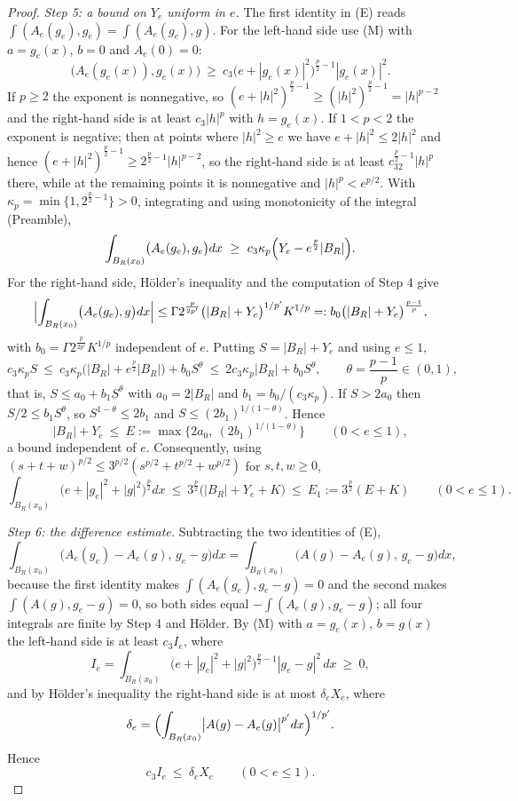 \begin{proof}
\emph{Step 5: a bound on $Y_e$ uniform in $e$.}  The first identity in (E) reads
$\int(A_e(g_e),g_e)=\int(A_e(g_e),g)$.  For the left-hand side use (M) with
$a=g_e(x)$, $b=0$ and $A_e(0)=0$:
\[
\bigl(A_e(g_e(x)),g_e(x)\bigr)\ \ge\ c_3\bigl(e+|g_e(x)|^2\bigr)^{\frac p2-1}|g_e(x)|^2 .
\]
If $p\ge2$ the exponent is nonnegative, so
$(e+|h|^2)^{\frac p2-1}\ge(|h|^2)^{\frac p2-1}=|h|^{p-2}$ and the right-hand
side is at least $c_3|h|^p$ with $h=g_e(x)$.  If $1<p<2$ the exponent is
negative; then at points where $|h|^2\ge e$ we have $e+|h|^2\le2|h|^2$ and hence
$(e+|h|^2)^{\frac p2-1}\ge2^{\frac p2-1}|h|^{p-2}$, so the right-hand side is at
least $c_32^{\frac p2-1}|h|^p$ there, while at the remaining points it is
nonnegative and $|h|^p<e^{p/2}$.  With $\kappa_p=\min\{1,2^{\frac p2-1}\}>0$,
integrating and using monotonicity of the integral (Preamble),
\[
\int_{B_R(x_0)}\bigl(A_e(g_e),g_e\bigr)dx
\ \ge\ c_3\kappa_p\Bigl(Y_e-e^{\frac p2}|B_R|\Bigr).
\]
For the right-hand side, Hölder's inequality and the computation of Step 4 give
\[
\Bigl|\int_{B_R(x_0)}\bigl(A_e(g_e),g\bigr)dx\Bigr|
\le\Gamma2^{\frac p{2p'}}\bigl(|B_R|+Y_e\bigr)^{1/p'}K^{1/p}
=:b_0\bigl(|B_R|+Y_e\bigr)^{\frac{p-1}p},
\]
with $b_0=\Gamma2^{\frac p{2p'}}K^{1/p}$ independent of $e$.  Putting
$S=|B_R|+Y_e$ and using $e\le1$,
\[
c_3\kappa_pS\ \le\ c_3\kappa_p\bigl(|B_R|+e^{\frac p2}|B_R|\bigr)+b_0S^{\theta}
\ \le\ 2c_3\kappa_p|B_R|+b_0S^{\theta},
\qquad \theta=\frac{p-1}p\in(0,1),
\]
that is, $S\le a_0+b_1S^{\theta}$ with $a_0=2|B_R|$ and
$b_1=b_0/(c_3\kappa_p)$.  If $S>2a_0$ then $S/2\le b_1S^{\theta}$, so
$S^{1-\theta}\le2b_1$ and $S\le(2b_1)^{1/(1-\theta)}$.  Hence
\[
|B_R|+Y_e\ \le\ E:=\max\bigl\{2a_0,\ (2b_1)^{1/(1-\theta)}\bigr\}
\qquad(0<e\le1),
\tag{5a}
\]
a bound independent of $e$.  Consequently, using
$(s+t+w)^{p/2}\le3^{p/2}(s^{p/2}+t^{p/2}+w^{p/2})$ for $s,t,w\ge0$,
\[
\int_{B_R(x_0)}\bigl(e+|g_e|^2+|g|^2\bigr)^{\frac p2}dx
\ \le\ 3^{\frac p2}\bigl(|B_R|+Y_e+K\bigr)\ \le\ E_1:=3^{\frac p2}(E+K)
\qquad(0<e\le1).
\tag{5b}
\]

\emph{Step 6: the difference estimate.}  Subtracting the two identities of (E),
\[
\int_{B_R(x_0)}\bigl(A_e(g_e)-A_e(g),\,g_e-g\bigr)dx
=\int_{B_R(x_0)}\bigl(A(g)-A_e(g),\,g_e-g\bigr)dx ,
\]
because the first identity makes $\int(A_e(g_e),g_e-g)=0$ and the second makes
$\int(A(g),g_e-g)=0$, so both sides equal $-\int(A_e(g),g_e-g)$; all four
integrals are finite by Step 4 and Hölder.  By (M) with $a=g_e(x)$, $b=g(x)$ the
left-hand side is at least $c_3I_e$, where
\[
I_e=\int_{B_R(x_0)}\bigl(e+|g_e|^2+|g|^2\bigr)^{\frac p2-1}|g_e-g|^2\,dx\ \ge\ 0 ,
\]
and by Hölder's inequality the right-hand side is at most $\delta_eX_e$, where
\[
\delta_e=\Bigl(\int_{B_R(x_0)}\bigl|A(g)-A_e(g)\bigr|^{p'}dx\Bigr)^{1/p'} .
\]
Hence
\[
c_3I_e\ \le\ \delta_eX_e\qquad(0<e\le1).
\tag{6}
\]


\end{proof}

